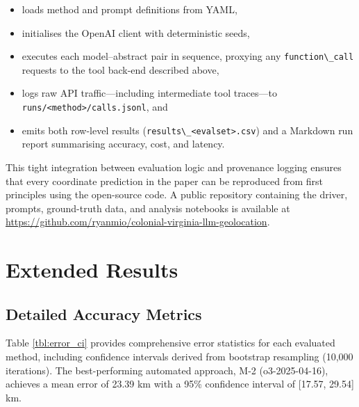 \begin{itemize}
\tightlist
\item
  loads method and prompt definitions from YAML,
\item
  initialises the OpenAI client with deterministic seeds,
\item
  executes each model--abstract pair in sequence, proxying any
  \passthrough{\lstinline!function\_call!} requests to the tool back-end
  described above,
\item
  logs raw API traffic---including intermediate tool traces---to
  \passthrough{\lstinline!runs/<method>/calls.jsonl!}, and
\item
  emits both row-level results
  (\passthrough{\lstinline!results\_<evalset>.csv!}) and a Markdown run
  report summarising accuracy, cost, and latency.
\end{itemize}

This tight integration between evaluation logic and provenance logging
ensures that every coordinate prediction in the paper can be reproduced
from first principles using the open-source code. A public repository
containing the driver, prompts, ground-truth data, and analysis
notebooks is available at
\url{https://github.com/ryanmio/colonial-virginia-llm-geolocation}.

\section{Extended
Results}\label{appendix-b-extended-results}

\subsection{Detailed Accuracy
Metrics}\label{b.1-detailed-accuracy-metrics}

Table \ref{tbl:error_ci} provides comprehensive error statistics for
each evaluated method, including confidence intervals derived from
bootstrap resampling (10,000 iterations). The best-performing automated
approach, M-2 (o3-2025-04-16), achieves a mean error of 23.39 km with a
95\% confidence interval of {[}17.57, 29.54{]} km.

